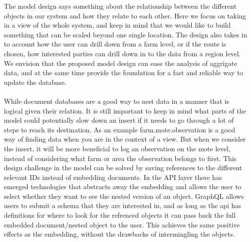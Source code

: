\documentclass[]{uiophd}
\begin{document}
The model design says something about the relationship between the different objects in our system and how they relate to each other. Here we focus on taking in a view of the whole system, and keep in mind that we would like to build something that can be scaled beyond one single location. The design also takes in to account how the user can drill down from a farm level, or if the route is chosen, how interested parties can drill down in to the data from a region level. We envision that the proposed model design can ease the analysis of aggrigate data, and at the same time provide the foundation for a fast and reliable way to update the database.
\\\\
While document databases are a good way to nest data in a manner that is logical given their relation. It is still important to keep in  mind what parts of the model could potentially slow down an insert if it needs to go through a lot of steps to reach its destination. As an example farm.mote.observation is a good way of finding data when you are in the context of a view. But when we consider the insert, it will be more beneficial to log an observation on the mote level, instead of considering what farm or area the observation belongs to first. This design challenge in the model can be solved by saving references to the different relevant IDs instead of embedding documents. In the API layer there has emerged technologies that abstracts away the embedding and allows the user to select whether they want to see the nested version of an object. GraphQL allows users to submit a schema that they are interested in, and as long as the api has definitions for where to look for the refrenced objects it can pass back the full embedded document/nested object to the user. This achieves the same positive effects as the embedding, without the drawbacks of intermingling the objects.
\end{document}

